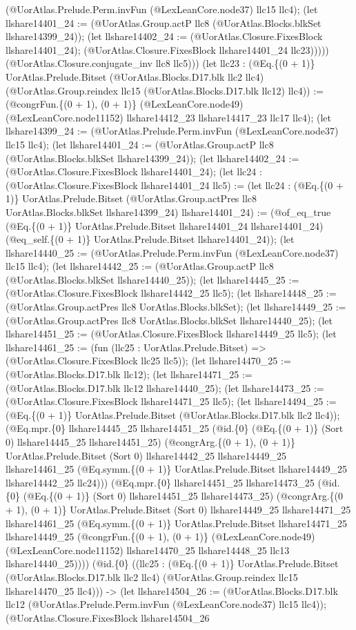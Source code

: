 \documentclass[11pt]{article}
\begin{document}
(@UorAtlas.Prelude.Perm.invFun (@LexLeanCore.node37) llc15 llc4); (let llshare14401\_24 := (@UorAtlas.Group.actP llc8 (@UorAtlas.Blocks.blkSet llshare14399\_24)); (let llshare14402\_24 := (@UorAtlas.Closure.FixesBlock llshare14401\_24); (@UorAtlas.Closure.FixesBlock llshare14401\_24 llc23))))) (@UorAtlas.Closure.conjugate\_inv llc8 llc5))) (let llc23 : (@Eq.\{(0 + 1)\} UorAtlas.Prelude.Bitset (@UorAtlas.Blocks.D17.blk llc2 llc4) (@UorAtlas.Group.reindex llc15 (@UorAtlas.Blocks.D17.blk llc12) llc4)) := (@congrFun.\{(0 + 1), (0 + 1)\} (@LexLeanCore.node49) (@LexLeanCore.node11152) llshare14412\_23 llshare14417\_23 llc17 llc4); (let llshare14399\_24 := (@UorAtlas.Prelude.Perm.invFun (@LexLeanCore.node37) llc15 llc4); (let llshare14401\_24 := (@UorAtlas.Group.actP llc8 (@UorAtlas.Blocks.blkSet llshare14399\_24)); (let llshare14402\_24 := (@UorAtlas.Closure.FixesBlock llshare14401\_24); (let llc24 : (@UorAtlas.Closure.FixesBlock llshare14401\_24 llc5) := (let llc24 : (@Eq.\{(0 + 1)\} UorAtlas.Prelude.Bitset (@UorAtlas.Group.actPres llc8 UorAtlas.Blocks.blkSet llshare14399\_24) llshare14401\_24) := (@of\_eq\_true (@Eq.\{(0 + 1)\} UorAtlas.Prelude.Bitset llshare14401\_24 llshare14401\_24) (@eq\_self.\{(0 + 1)\} UorAtlas.Prelude.Bitset llshare14401\_24)); (let llshare14440\_25 := (@UorAtlas.Prelude.Perm.invFun (@LexLeanCore.node37) llc15 llc4); (let llshare14442\_25 := (@UorAtlas.Group.actP llc8 (@UorAtlas.Blocks.blkSet llshare14440\_25)); (let llshare14445\_25 := (@UorAtlas.Closure.FixesBlock llshare14442\_25 llc5); (let llshare14448\_25 := (@UorAtlas.Group.actPres llc8 UorAtlas.Blocks.blkSet); (let llshare14449\_25 := (@UorAtlas.Group.actPres llc8 UorAtlas.Blocks.blkSet llshare14440\_25); (let llshare14451\_25 := (@UorAtlas.Closure.FixesBlock llshare14449\_25 llc5); (let llshare14461\_25 := (fun (llc25 : UorAtlas.Prelude.Bitset) => (@UorAtlas.Closure.FixesBlock llc25 llc5)); (let llshare14470\_25 := (@UorAtlas.Blocks.D17.blk llc12); (let llshare14471\_25 := (@UorAtlas.Blocks.D17.blk llc12 llshare14440\_25); (let llshare14473\_25 := (@UorAtlas.Closure.FixesBlock llshare14471\_25 llc5); (let llshare14494\_25 := (@Eq.\{(0 + 1)\} UorAtlas.Prelude.Bitset (@UorAtlas.Blocks.D17.blk llc2 llc4)); (@Eq.mpr.\{0\} llshare14445\_25 llshare14451\_25 (@id.\{0\} (@Eq.\{(0 + 1)\} (Sort 0) llshare14445\_25 llshare14451\_25) (@congrArg.\{(0 + 1), (0 + 1)\} UorAtlas.Prelude.Bitset (Sort 0) llshare14442\_25 llshare14449\_25 llshare14461\_25 (@Eq.symm.\{(0 + 1)\} UorAtlas.Prelude.Bitset llshare14449\_25 llshare14442\_25 llc24))) (@Eq.mpr.\{0\} llshare14451\_25 llshare14473\_25 (@id.\{0\} (@Eq.\{(0 + 1)\} (Sort 0) llshare14451\_25 llshare14473\_25) (@congrArg.\{(0 + 1), (0 + 1)\} UorAtlas.Prelude.Bitset (Sort 0) llshare14449\_25 llshare14471\_25 llshare14461\_25 (@Eq.symm.\{(0 + 1)\} UorAtlas.Prelude.Bitset llshare14471\_25 llshare14449\_25 (@congrFun.\{(0 + 1), (0 + 1)\} (@LexLeanCore.node49) (@LexLeanCore.node11152) llshare14470\_25 llshare14448\_25 llc13 llshare14440\_25)))) (@id.\{0\} ((llc25 : (@Eq.\{(0 + 1)\} UorAtlas.Prelude.Bitset (@UorAtlas.Blocks.D17.blk llc2 llc4) (@UorAtlas.Group.reindex llc15 llshare14470\_25 llc4))) -> (let llshare14504\_26 := (@UorAtlas.Blocks.D17.blk llc12 (@UorAtlas.Prelude.Perm.invFun (@LexLeanCore.node37) llc15 llc4)); (@UorAtlas.Closure.FixesBlock llshare14504\_26 
\end{document}
